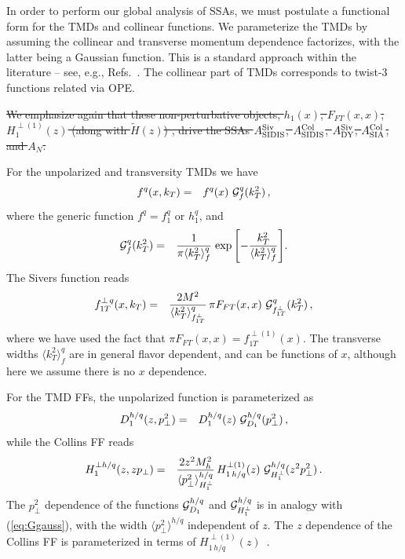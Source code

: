 \documentclass[twocolumn,prl,aps,superscriptaddress
               ,footinbib,amsfonts,amsmath,amssymb,showpacs]{revtex4-1}
\def\kT{k_T}
\def\pperp{p_\perp}
\def\avkT{\la \kT^2 \ra}
\def\avpperp{\la \pperp^2 \ra}
\newcommand{\la}{\langle}
\newcommand{\ra}{\rangle}
\newcommand{\old}[1]{{\color{red}\sout{#1}}}
\newcommand{\new}[1]{{\color{blue}#1}}
\begin{document}
\vspace{0.1cm}
%
In order to perform our global analysis of SSAs, we must postulate a
functional form for the TMDs and collinear functions.
%
We parameterize the TMDs by assuming the collinear and transverse
momentum dependence factorizes, with the latter being a Gaussian
function.  
%
This is a standard approach within the literature -- see, e.g.,
Refs.~\cite{Anselmino:2007fs,Anselmino:2008jk,Anselmino:2013vqa}.  
%
\new{The collinear part of TMDs corresponds to twist-3 functions related via OPE.} 

\old{We emphasize again that these
non-perturbative objects, 
    $h_1(x)$, 
    $F_{FT}(x,x)$, 
    $H_1^{\perp(1)}(z)$
    (along with $\tilde{H}(z)$)
, drive the SSAs 
    $A_{\rm SIDIS}^{\rm Siv}$,
    $A_{\rm SIDIS}^{\rm Col}$, 
    $A_{\rm DY}^{\rm Siv}$, 
    $A_{\rm SIA}^{\rm Col}$, and 
    $A_N$.}

%
For the unpolarized and transversity TMDs we have
%
\begin{eqnarray}
f^q(x,k_T) 
&=& f^q(x)\ {\cal G}_{f}^q(k_T^2)\,,
\label{eq:f1h1-gauss}
\end{eqnarray}
%
where the generic function $f^q = f_1^q$ or $h_1^q$, and
%
\begin{eqnarray}
{\cal G}_f^q(k_T^2)
&=& \frac{1}{\pi\avkT_f^q}\;
{\exp\left[{-\frac{\kT^2}{\avkT_f^q}}\right]}.
\label{eq:Ggauss}
\end{eqnarray}
%
The Sivers function reads
%
\begin{eqnarray}
f_{1T}^{\perp \,q}(x,k_T)
&=& \frac{2 M^2}{\avkT^{q}_{f_{1T}^\perp}}\,
    \pi F_{FT}(x,x)\
    {\cal G}_{f_{1T}^\perp}^{q}(k_T^2)\,,
\label{e:sivers}
\end{eqnarray}
%
where we have used the fact that 
$\pi F_{FT}(x,x)=f_{1T}^{\perp(1)}(x)$. 
%
The transverse widths $\avkT_{f}^q$ are in general flavor dependent,
and can be functions of $x$, although here we assume there is no $x$
dependence.

For the TMD FFs, the unpolarized function is parameterized as
%
\begin{eqnarray}
D_1^{h/q}(z,\pperp^2)
&=& D_1^{h/q}(z)\ {\cal G}_{D_1}^{h/q}(\pperp^2)\,,
\end{eqnarray}
%
while the Collins FF reads
%
\begin{eqnarray}
H_1^{\perp h/q}(z,z\pperp)
&=& \frac{2 z^2 M_h^2}{\avpperp^{h/q}_{H_1^\perp}}\,
    H_{1\, h/q}^{\perp (1)}(z)\
    {\cal G}_{H_1^\perp}^{h/q}(z^2\pperp^2)\,.
\label{e:collins}
\end{eqnarray}
%
The $\pperp^2$ dependence of the functions
	${\cal G}_{D_1}^{h/q}$ and
	${\cal G}_{H_1^\perp}^{h/q}$
is in analogy with (\ref{eq:Ggauss}),
with the width $\avpperp^{h/q}$ independent of $z$.
%
The $z$ dependence of the Collins FF is parameterized in terms
of $H_{1\, h/q}^{\perp (1)}(z)$~\cite{Kang:2015msa}.  
\end{document}
